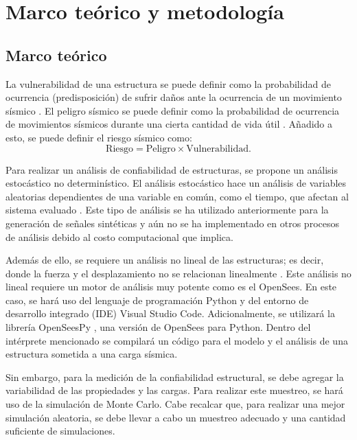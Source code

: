 \chapter{Marco teórico y metodología}

\section{Marco teórico}
La vulnerabilidad de una estructura se puede definir como la probabilidad de ocurrencia (predisposición) de sufrir daños ante la ocurrencia de un movimiento sísmico \cite{bonett2003}. El peligro sísmico se puede definir como la probabilidad de ocurrencia de movimientos sísmicos durante una cierta cantidad de vida útil \cite{bommer1998}. Añadido a esto, se puede definir el riesgo sísmico como:
\begin{equation}
\text{Riesgo} = \text{Peligro} \times \text{Vulnerabilidad}.
\end{equation}

Para realizar un análisis de confiabilidad de estructuras, se propone un análisis estocástico no determinístico. El análisis estocástico hace un análisis de variables aleatorias dependientes de una variable en común, como el tiempo, que afectan al sistema evaluado \cite{ramirez2007}. Este tipo de análisis se ha utilizado anteriormente para la generación de señales sintéticas y aún no se ha implementado en otros procesos de análisis debido al costo computacional que implica.

Además de ello, se requiere un análisis no lineal de las estructuras; es decir, donde la fuerza y el desplazamiento no se relacionan linealmente \cite{hanganu1997}. Este análisis no lineal requiere un motor de análisis muy potente como es el OpenSees. En este caso, se hará uso del lenguaje de programación Python y del entorno de desarrollo integrado (IDE) Visual Studio Code. Adicionalmente, se utilizará la librería OpenSeesPy \cite{zhu2018}, una versión de OpenSees para Python. Dentro del intérprete mencionado se compilará un código para el modelo y el análisis de una estructura sometida a una carga sísmica. 

Sin embargo, para la medición de la confiabilidad estructural, se debe agregar la variabilidad de las propiedades y las cargas. Para realizar este muestreo, se hará uso de la simulación de Monte Carlo. Cabe recalcar que, para realizar una mejor simulación aleatoria, se debe llevar a cabo un muestreo adecuado y una cantidad suficiente de simulaciones.

